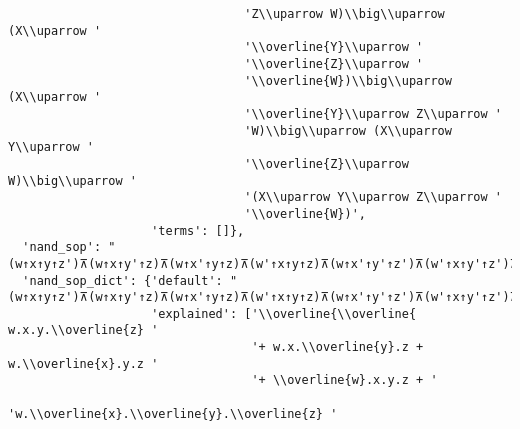 \begin{verbatim}
                                 'Z\\uparrow W)\\big\\uparrow (X\\uparrow '
                                 '\\overline{Y}\\uparrow '
                                 '\\overline{Z}\\uparrow '
                                 '\\overline{W})\\big\\uparrow (X\\uparrow '
                                 '\\overline{Y}\\uparrow Z\\uparrow '
                                 'W)\\big\\uparrow (X\\uparrow Y\\uparrow '
                                 '\\overline{Z}\\uparrow W)\\big\\uparrow '
                                 '(X\\uparrow Y\\uparrow Z\\uparrow '
                                 '\\overline{W})',
                    'terms': []},
  'nand_sop': "(w↑x↑y↑z')⊼(w↑x↑y'↑z)⊼(w↑x'↑y↑z)⊼(w'↑x↑y↑z)⊼(w↑x'↑y'↑z')⊼(w'↑x↑y'↑z')⊼(w'↑x'↑y↑z')⊼(w'↑x'↑y'↑z)",
  'nand_sop_dict': {'default': "(w↑x↑y↑z')⊼(w↑x↑y'↑z)⊼(w↑x'↑y↑z)⊼(w'↑x↑y↑z)⊼(w↑x'↑y'↑z')⊼(w'↑x↑y'↑z')⊼(w'↑x'↑y↑z')⊼(w'↑x'↑y'↑z)",
                    'explained': ['\\overline{\\overline{ w.x.y.\\overline{z} '
                                  '+ w.x.\\overline{y}.z + w.\\overline{x}.y.z '
                                  '+ \\overline{w}.x.y.z + '
                                  'w.\\overline{x}.\\overline{y}.\\overline{z} '

\end{verbatim}
